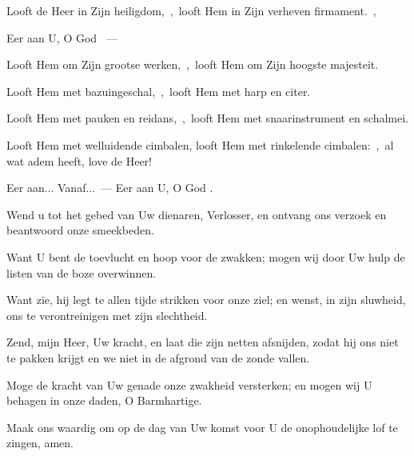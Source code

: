 \documentclass[12pt,twoside,a5paper]{article}
\begin{document}
\begin{halfparskip}
   

  Looft de Heer in Zijn heiligdom,~\sep\ looft Hem in Zijn verheven firmament.~\sep

  Eer aan U, O God ~---  

  Looft Hem om Zijn grootse werken,~\sep\ looft Hem om Zijn hoogste majesteit.

  Looft Hem met bazuingeschal,~\sep\ looft Hem met harp en citer.

  Looft Hem met pauken en reidans,~\sep\ looft Hem met snaarinstrument en schalmei.

  Looft Hem met welluidende cimbalen, looft Hem met rinkelende cimbalen:~\sep\ al wat adem heeft, love de Heer!
\end{halfparskip}

\begin{halfparskip}
   Eer aan... Vanaf...~--- Eer aan U, O God .
\end{halfparskip}



\begin{halfparskip}

  Wend u tot het gebed van Uw dienaren, Verlosser, en ontvang ons verzoek en beantwoord onze smeekbeden.

  Want U bent de toevlucht en hoop voor de zwakken; mogen wij door Uw hulp de listen van de boze overwinnen.

  Want zie, hij legt te allen tijde strikken voor onze ziel; en wenst, in zijn sluwheid, ons te verontreinigen met zijn slechtheid.

  Zend, mijn Heer, Uw kracht, en laat die zijn netten afsnijden, zodat hij ons niet te pakken krijgt en we niet in de afgrond van de zonde vallen.

  Moge de kracht van Uw genade onze zwakheid versterken; en mogen wij U behagen in onze daden, O Barmhartige.

  Maak ons waardig om op de dag van Uw komst voor U de onophoudelijke lof te zingen, amen.
\end{halfparskip}
\end{document}
